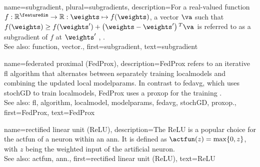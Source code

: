 {name={subgradient}, plural={subgradients},
	description={For a real-valued \gls{function} $f: \mathbb{R}^{\featuredim} \rightarrow \mathbb{R}: \weights \mapsto f(\weights)$, 
		a \gls{vector} $\va$ such that $f(\weights) \geq  f(\weights') +\big(\weights-\weights' \big)\,^{T} \va$ is 
		referred to as a subgradient of $f$ at $\weights'$ \cite{BertCvxAnalOpt}, \cite{BertsekasNonLinProgr}.
		\\
		See also: \gls{function}, \gls{vector}.},
	first={subgradient},
	text={subgradient} 
}

{name={federated proximal (FedProx)},
	description={FedProx refers to an iterative \gls{fl} \gls{algorithm} that alternates between separately 
		training \glspl{localmodel} and combining the updated local \glspl{modelparam}. In contrast to \gls{fedavg}, which uses 
		\gls{stochGD} to train \glspl{localmodel}, FedProx uses a \gls{proxop} for the training \cite{FedProx2020}.
					\\ 
		See also: \gls{fl}, \gls{algorithm}, \gls{localmodel}, \glspl{modelparam}, \gls{fedavg}, \gls{stochGD}, \gls{proxop}.}, 
	first={FedProx}, 
	text={FedProx} 
}

{name={rectified linear unit (ReLU)},
	description={The ReLU is 
		a popular choice for the \gls{actfun} of a neuron within an \gls{ann}. It is defined 
		as $\actfun(z) = \max\{0,z\}$, with $z$ being the weighted input of the artificial 
		neuron.
					\\ 
		See also: \gls{actfun}, \gls{ann}.}, 
	first={rectified linear unit (ReLU)}, 
	text={ReLU} 
}

